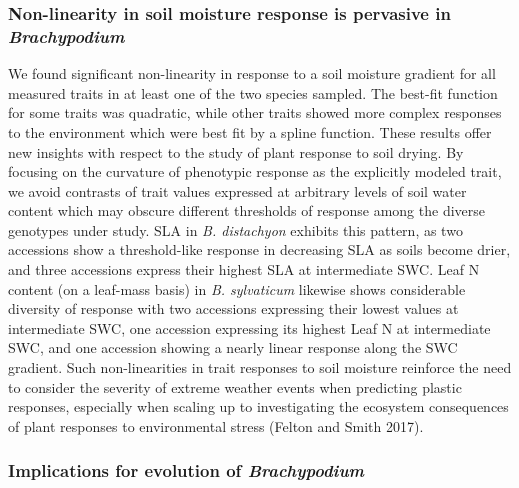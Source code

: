 \documentclass[jou,floatsintext]{apa6}
\begin{document}
\hypertarget{non-linearity-in-soil-moisture-response-is-pervasive-in-brachypodium}{%
\subsubsection{\texorpdfstring{Non-linearity in soil moisture response is pervasive in \emph{Brachypodium}}{Non-linearity in soil moisture response is pervasive in Brachypodium}}\label{non-linearity-in-soil-moisture-response-is-pervasive-in-brachypodium}}

We found significant non-linearity in response to a soil moisture gradient for all measured traits in at least one of the two species sampled. The best-fit function for some traits was quadratic, while other traits showed more complex responses to the environment which were best fit by a spline function. These results offer new insights with respect to the study of plant response to soil drying. By focusing on the curvature of phenotypic response as the explicitly modeled trait, we avoid contrasts of trait values expressed at arbitrary levels of soil water content which may obscure different thresholds of response among the diverse genotypes under study. SLA in \emph{B. distachyon} exhibits this pattern, as two accessions show a threshold-like response in decreasing SLA as soils become drier, and three accessions express their highest SLA at intermediate SWC. Leaf N content (on a leaf-mass basis) in \emph{B. sylvaticum} likewise shows considerable diversity of response with two accessions expressing their lowest values at intermediate SWC, one accession expressing its highest Leaf N at intermediate SWC, and one accession showing a nearly linear response along the SWC gradient. Such non-linearities in trait responses to soil moisture reinforce the need to consider the severity of extreme weather events when predicting plastic responses, especially when scaling up to investigating the ecosystem consequences of plant responses to environmental stress (Felton and Smith 2017).

\hypertarget{implications-for-evolution-of-brachypodium}{%
\subsubsection{\texorpdfstring{Implications for evolution of \emph{Brachypodium}}{Implications for evolution of Brachypodium}}\label{implications-for-evolution-of-brachypodium}}
\end{document}
